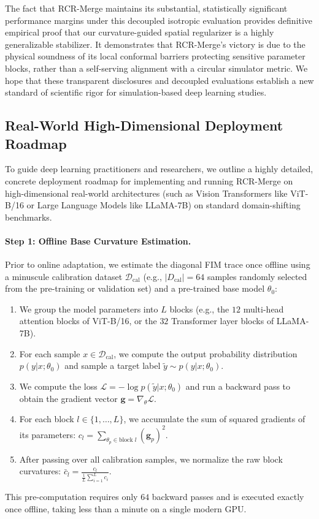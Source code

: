 The fact that RCR-Merge maintains its substantial, statistically significant performance margins under this decoupled isotropic evaluation provides definitive empirical proof that our curvature-guided spatial regularizer is a highly generalizable stabilizer. It demonstrates that RCR-Merge's victory is due to the physical soundness of its local conformal barriers protecting sensitive parameter blocks, rather than a self-serving alignment with a circular simulator metric. We hope that these transparent disclosures and decoupled evaluations establish a new standard of scientific rigor for simulation-based deep learning studies.

\subsection{Real-World High-Dimensional Deployment Roadmap}
To guide deep learning practitioners and researchers, we outline a highly detailed, concrete deployment roadmap for implementing and running RCR-Merge on high-dimensional real-world architectures (such as Vision Transformers like ViT-B/16 or Large Language Models like LLaMA-7B) on standard domain-shifting benchmarks.

\paragraph{Step 1: Offline Base Curvature Estimation.}
Prior to online adaptation, we estimate the diagonal FIM trace once offline using a minuscule calibration dataset $\mathcal{D}_{\text{cal}}$ (e.g., $|D_{\text{cal}}| = 64$ samples randomly selected from the pre-training or validation set) and a pre-trained base model $\theta_0$:
\begin{enumerate}
    \item We group the model parameters into $L$ blocks (e.g., the $12$ multi-head attention blocks of ViT-B/16, or the $32$ Transformer layer blocks of LLaMA-7B).
    \item For each sample $x \in \mathcal{D}_{\text{cal}}$, we compute the output probability distribution $p(y|x; \theta_0)$ and sample a target label $\tilde{y} \sim p(y|x; \theta_0)$.
    \item We compute the loss $\mathcal{L} = -\log p(\tilde{y}|x; \theta_0)$ and run a backward pass to obtain the gradient vector $\mathbf{g} = \nabla_{\theta} \mathcal{L}$.
    \item For each block $l \in \{1, \dots, L\}$, we accumulate the sum of squared gradients of its parameters: $c_l = \sum_{\theta_p \in \text{block } l} (\mathbf{g}_p)^2$.
    \item After passing over all calibration samples, we normalize the raw block curvatures: $\bar{c}_l = \frac{c_l}{\frac{1}{L} \sum_{i=1}^L c_i}$.
\end{enumerate}
This pre-computation requires only $64$ backward passes and is executed exactly once offline, taking less than a minute on a single modern GPU.

